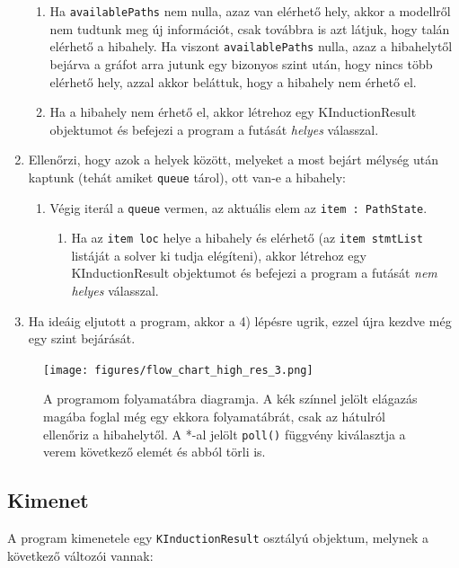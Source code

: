 \begin{enumerate}
\begin{enumerate}
		\item Ha \texttt{availablePaths} nem nulla, azaz van elérhető hely, akkor a modellről nem tudtunk meg új információt, csak továbbra is azt látjuk, hogy talán elérhető a hibahely. Ha viszont \texttt{availablePaths} nulla, azaz a hibahelytől bejárva a gráfot arra jutunk egy bizonyos szint után, hogy nincs több elérhető hely, azzal akkor beláttuk, hogy a hibahely nem érhető el.
		\item Ha a hibahely nem érhető el, akkor létrehoz egy KInductionResult objektumot és befejezi a program a futását \textit{helyes} válasszal.
	\end{enumerate}
	\item Ellenőrzi, hogy azok a helyek között, melyeket a most bejárt mélység után kaptunk (tehát amiket \texttt{queue} tárol), ott van-e a hibahely:
	\begin{enumerate}
		\item Végig iterál a \texttt{queue} vermen, az aktuális elem az \texttt{item : PathState}.
		\begin{enumerate}
			\item Ha az \texttt{item loc} helye a hibahely és elérhető (az \texttt{item stmtList} listáját a solver ki tudja elégíteni), akkor létrehoz egy KInductionResult objektumot és befejezi a program a futását \textit{nem helyes} válasszal.
		\end{enumerate}
	\end{enumerate}
	\item Ha ideáig eljutott a program, akkor a 4) lépésre ugrik, ezzel újra kezdve még egy szint bejárását.
\end{enumerate}

\begin{figure}[!ht]
	\centering
	\texttt{[image: figures/flow\_chart\_high\_res\_3.png]}
	\caption[Caption for LOF]{A programom folyamatábra diagramja. A kék színnel jelölt elágazás magába foglal még egy ekkora folyamatábrát, csak az hátulról ellenőriz a hibahelytől. A *-al jelölt \texttt{poll()} függvény kiválasztja a verem következő elemét és abból törli is.}
	\label{fig:state_diagram2}
\end{figure}
\clearpage

\subsection{Kimenet}
A program kimenetele egy \verb+KInductionResult+ osztályú objektum, melynek a következő változói vannak:

